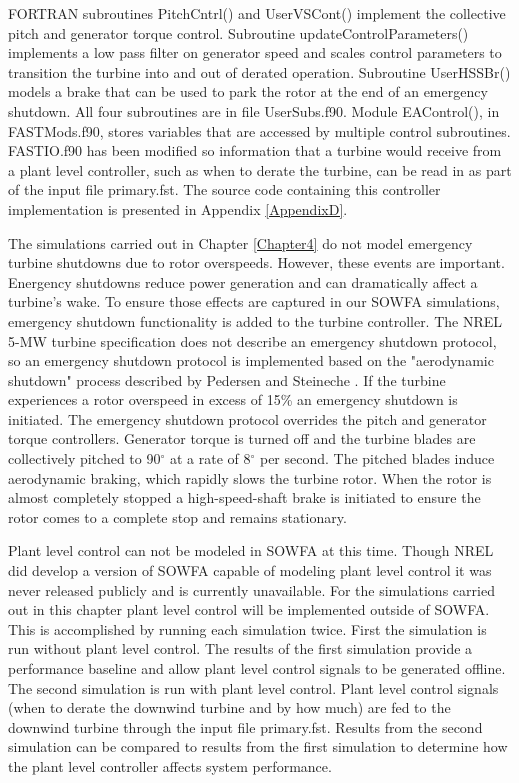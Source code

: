 FORTRAN subroutines PitchCntrl() and UserVSCont() implement the collective pitch and generator torque control. Subroutine updateControlParameters() implements a low pass filter on generator speed and scales control parameters to transition the turbine into and out of derated operation. Subroutine UserHSSBr() models a brake that can be used to park the rotor at the end of an emergency shutdown. All four subroutines are in file UserSubs.f90. Module EAControl(), in FAST\textunderscore Mods.f90, stores variables that are accessed by multiple control subroutines. FAST\textunderscore IO.f90 has been modified so information that a turbine would receive from a plant level controller, such as when to derate the turbine, can be read in as part of the input file primary.fst. The source code containing this controller implementation is presented in Appendix \ref{AppendixD}.   

The simulations carried out in Chapter \ref{Chapter4} do not model emergency turbine shutdowns due to rotor overspeeds. However, these events are important. Energency shutdowns reduce power generation and can dramatically affect a turbine's wake. To ensure those effects are captured in our SOWFA simulations, emergency shutdown functionality is added to the turbine controller. The NREL 5-MW turbine specification does not describe an emergency shutdown protocol\cite{jonkman2009}, so an emergency shutdown protocol is implemented based on the "aerodynamic shutdown" process described by Pedersen and Steineche \cite{pedersen2012}. If the turbine experiences a rotor overspeed in excess of 15\% an emergency shutdown is initiated. The emergency shutdown protocol overrides the pitch and generator torque controllers. Generator torque is turned off and the turbine blades are collectively pitched to 90$^{\circ}$ at a rate of 8$^{\circ}$ per second. The pitched blades induce aerodynamic braking, which rapidly slows the turbine rotor. When the rotor is almost completely stopped a high-speed-shaft brake is initiated to ensure the rotor comes to a complete stop and remains stationary.

Plant level control can not be modeled in SOWFA at this time. Though NREL did develop a version of SOWFA capable of modeling plant level control \cite{fleming2013,fleming2013a} it was never released publicly and is currently unavailable. For the simulations carried out in this chapter plant level control will be implemented outside of SOWFA. This is accomplished by running each simulation twice. First the simulation is run without plant level control. The results of the first simulation provide a performance baseline and allow plant level control signals to be generated offline. The second simulation is run with plant level control. Plant level control signals (when to derate the downwind turbine and by how much) are fed to the downwind turbine through the input file primary.fst. Results from the second simulation can be compared to results from the first simulation to determine how the plant level controller affects system performance. 

